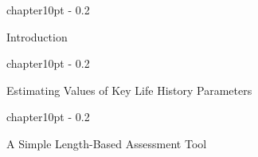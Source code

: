 \documentclass{report}\usepackage[]{graphicx}\usepackage[]{color}
\makeatletter
\renewcommand\chapter{\@startsection%
{chapter}{1}{0pt}%
{-\baselineskip}%
{0.2\baselineskip}%
{\raggedright\bf}}%
\makeatother
\begin{document}



\restoregeometry


\clearpage

\tableofcontents

\clearpage
\newpage

\large

\chapter{Introduction}


\clearpage
\newpage

\chapter{Estimating Values of Key Life History Parameters}


\clearpage
\newpage

\chapter{A Simple Length-Based Assessment Tool}

\end{document}
